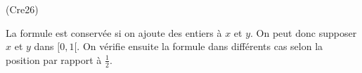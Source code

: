 \begin{tiny}(Cre26)\end{tiny} La formule est conservée si on ajoute des entiers à $x$ et $y$. On peut donc supposer $x$ et $y$ dans $[0,1[$. On vérifie ensuite la formule dans différents cas selon la position par rapport à $\frac{1}{2}$. 